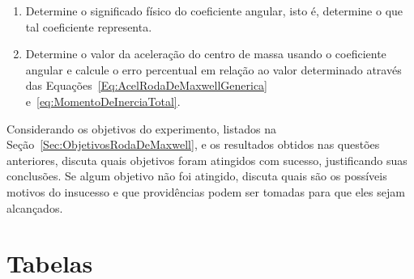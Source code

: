 \begin{question}[type={exam}]
\begin{enumerate}[label=\roman*.]
    \item Determine o significado físico do coeficiente angular, isto é, determine o que tal coeficiente representa.
    \item Determine o valor da aceleração do centro de massa usando o coeficiente angular e calcule o erro percentual em relação ao valor determinado através das Equações~\eqref{Eq:AcelRodaDeMaxwellGenerica} e~\eqref{eq:MomentoDeInerciaTotal}.
\end{enumerate}
\end{question}

\begin{question}[type={exam}]
Considerando os objetivos do experimento, listados na Seção~\ref{Sec:ObjetivosRodaDeMaxwell}, e os resultados obtidos nas questões anteriores, discuta quais objetivos foram atingidos com sucesso, justificando suas conclusões. Se algum objetivo não foi atingido, discuta quais são os possíveis motivos do insucesso e que providências podem ser tomadas para que eles sejam alcançados.
\end{question}

\vfill
\pagebreak
\section{Tabelas}


